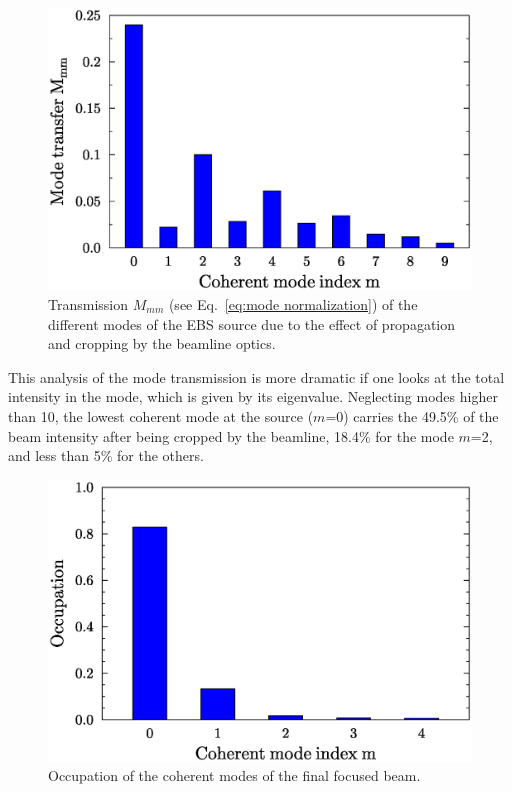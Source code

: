 \documentclass{iucr}              %
\begin{document}
\begin{figure}\label{fig:mode transmission}
    \centering
        \includegraphics[width=\textwidth]{GRAPHICS/propagated_modes.eps}
    \caption{Transmission $M_{mm}$ (see Eq.~\ref{eq:mode normalization}) of the different modes of the EBS source  due to the effect of propagation and cropping by the beamline optics.}
\end{figure}

This analysis of the mode transmission is more dramatic if one looks at the total intensity in the mode, which is given by its eigenvalue. Neglecting modes higher than 10, the lowest coherent mode at the source ($m$=0) carries the 49.5\% of the beam intensity after being cropped by the beamline, 18.4\% for the mode $m$=2, and less than 5\% for the others. 


\begin{figure}\label{fig:rediagonalization}
    \centering
        \includegraphics[width=\textwidth]{GRAPHICS/rediagonalized_modes.eps}
    \caption{Occupation of the coherent modes of the final focused beam.}
\end{figure}
\end{document}
